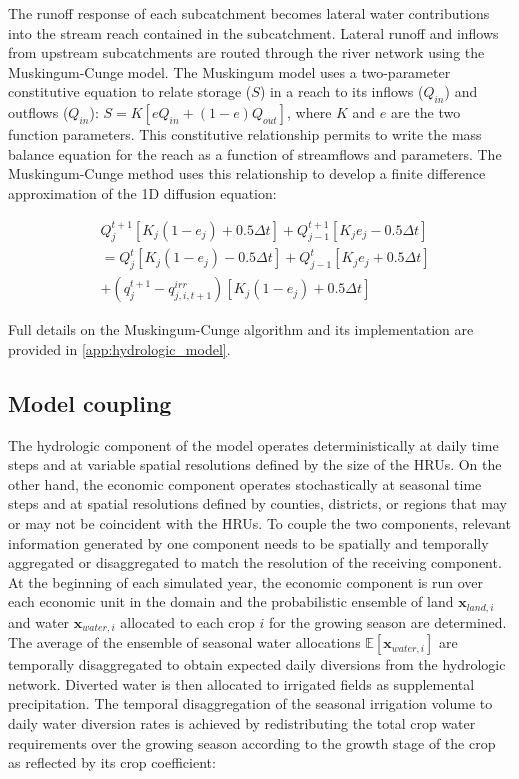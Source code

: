 The runoff response of each subcatchment becomes lateral water contributions into the stream reach contained in the subcatchment. Lateral runoff and inflows from upstream subcatchments are routed through the river network using the Muskingum-Cunge model. The Muskingum model uses a two-parameter constitutive equation to relate storage ($S$) in a reach to its inflows ($Q_{in}$) and outflows ($Q_{in}$): $S = K\left[eQ_{in} + (1 - e)Q_{out}\right]$, where $K$ and $e$ are the two function parameters.  This constitutive relationship permits to write the mass balance equation for the reach as a function of streamflows and parameters. The Muskingum-Cunge method uses this relationship to develop a finite difference approximation of the 1D diffusion equation:

\begin{align}
&Q_j^{t+1}\left[K_j(1 - e_j) + 0.5\Delta t  \right] + Q_{j-1}^{t+1}\left[K_je_j - 0.5\Delta t  \right]  \\
&= Q_j^{t}\left[K_j(1 - e_j) - 0.5\Delta t  \right] + Q_{j-1}^{t}\left[K_je_j + 0.5\Delta t  \right]\\
&+ (q_{j}^{t+1} - q^{irr}_{j,i,t+1}) \left[K_j(1 - e_j) + 0.5\Delta t  \right]
\end{align}

Full details on the Muskingum-Cunge algorithm and its implementation  are provided in \ref{app:hydrologic_model}.


\subsection{Model coupling}

The hydrologic component of the model operates deterministically at daily time steps and at variable spatial resolutions defined by the size of the HRUs. On the other hand, the economic component operates stochastically at seasonal time steps and at spatial resolutions defined by counties, districts, or regions that may or may not be coincident with the HRUs. To couple the two components, relevant information generated by one component needs to be spatially and temporally aggregated or disaggregated to match the resolution of the receiving component. At the beginning of each simulated year, the economic component is run over each economic unit in the domain and the probabilistic ensemble of land $\mathbf{x}_{land, i}$ and water $\mathbf{x}_{water, i}$ allocated to each crop $i$ for the growing season are determined. The average of the ensemble of seasonal water allocations $\mathbb{E}[\mathbf{x}_{water, i}]$ are temporally disaggregated to obtain expected daily diversions from the hydrologic network. Diverted water is then allocated to irrigated fields as supplemental precipitation. The temporal disaggregation of the seasonal irrigation volume to daily water diversion rates is achieved by redistributing the total crop water requirements over the growing season according to the growth stage of the crop as reflected by its crop coefficient:    

